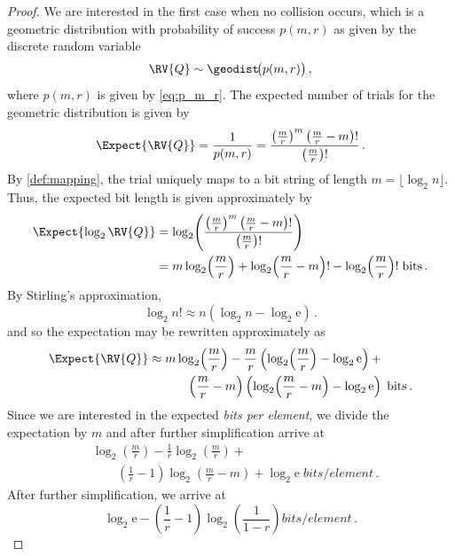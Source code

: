 \documentclass[ ../main.tex]{subfiles}
\begin{document}
\begin{proof}
We are interested in the first case when no collision occurs, which is a geometric distribution with probability of success $p(m,r)$ as given by the discrete random variable
\begin{equation}
    \RV{Q} \sim \geodist\!\bigl(p\!\left(m,r\right)\bigr)\,,
\end{equation}
where $p(m,r)$ is given by \cref{eq:p_m_r}. The expected number of trials for the geometric distribution is given by
\begin{equation}
    \Expect{\RV{Q}} = \frac{1}{p(m,r)} = \frac{\left(\frac{m}{r}\right)^m \left(\frac{m}{r}-m\right)!}{\left(\frac{m}{r}\right)!}\,.
\end{equation}
By \cref{def:mapping}, the \nth trial uniquely maps to a bit string of length $m = \lfloor \log_2 n \rfloor$. Thus, the expected bit length is given approximately by
\begin{align}
    \Expect{\log_2 \RV{Q}}
        &= \log_2\!\left(\frac{\left(\frac{m}{r}\right)^m \left(\frac{m}{r}-m\right)!}{\left(\frac{m}{r}\right)!}\right)\\
        &= m \log_2\!\left(\frac{m}{r}\right) +
            \log_2\!\left(\frac{m}{r}-m\right)! - \log_2\!\left(\frac{m}{r}\right)! \; \si{bits}\,.
\end{align}
By Stirling's approximation, 
\begin{equation}
    \log_2 n! \approx n \left(\log_2 n - \log_2 \mathrm{e}\right)\,.
\end{equation}
and so the expectation may be rewritten approximately as
\begin{equation}
\begin{split}
    \Expect{\RV{Q}} \approx &\;
        m \log_2\!\left(\frac{m}{r}\right) -
            \frac{m}{r} \left(\log_2\!\left(\frac{m}{r}\right) - \log_2 \mathrm{e}\right) +\\
        &\qquad\left(\frac{m}{r}-m\right) \left(\log_2\!\left(\frac{m}{r}-m\right) - \log_2 \mathrm{e} \right) \; \si{bits}\,.
\end{split}
\end{equation}
Since we are interested in the expected \emph{bits per element}, we divide the expectation by $m$ and after further simplification arrive at
\begin{equation}
\begin{split}
    &\log_2\!\left(\frac{m}{r}\right) - \frac{1}{r} \log_2\!\left(\frac{m}{r}\right) +\\
    &\qquad \left(\frac{1}{r}-1\right) \log_2\!\left(\frac{m}{r}-m\right) + \log_2 \mathrm{e} \; \si{bits \per element}\,.
\end{split}
\end{equation}
After further simplification, we arrive at
\begin{equation}
    \log_2 \mathrm{e} - \left(\frac{1}{r} - 1\right) \log_2\!\left(\frac{1}{1-r}\right) \si{bits \per element}\,.
\end{equation}
\end{proof}
\end{document}
